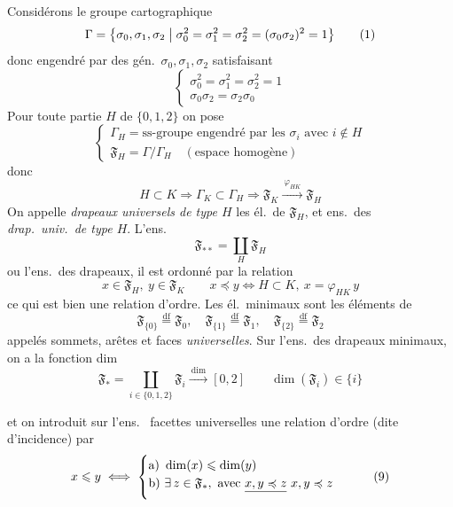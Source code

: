 \documentclass[11pt,a4paper]{article}
\begin{document}
Considérons le groupe cartographique
\[
\Gamma = \bigl\{\sigma_0, \sigma_1, \sigma_2 \bigm| \sigma_0^2 = \sigma_1^2 = \sigma_2^2 = (\sigma_0\sigma_2)^2 = 1\bigr\} \tag{1}
\]
donc engendré par des gén.\ $\sigma_0, \sigma_1, \sigma_2$ satisfaisant
\[
\begin{cases} \sigma_0^2 = \sigma_1^2 = \sigma_2^2 = 1 \\ \sigma_0\sigma_2 = \sigma_2\sigma_0 \end{cases} \tag{2}
\]
 Pour toute partie  \struck{\ill{}} $H$ de $\{0, 1, 2\}$  on pose
\[
\begin{cases}
\Gamma_H = \text{ss-groupe engendré par les } \sigma_i \text{ avec } i \notin H \\
\mathfrak{F}_H = \Gamma/\Gamma_H \quad (\text{espace homogène})
\end{cases} \tag{3}
\]
 donc
\[
H \subset K \Rightarrow \Gamma_K \subset \Gamma_H \Rightarrow \mathfrak{F}_K \xrightarrow{\ \varphi_{HK}\ } \mathfrak{F}_H \tag{4}
\]
On appelle \emph{drapeaux universels de type $H$} les él.\ de $\mathfrak{F}_H$, et \struck{\ill{}} ens.\ des \emph{drap.\ univ.\ de type $H$}. L'ens.
\[
\mathfrak{F}_{**} = \coprod_{H} \mathfrak{F}_H \tag{5}
\]
ou l'ens.\ des drapeaux, il est ordonné par la relation
\[
x \in \mathfrak{F}_H,\ y \in \mathfrak{F}_K \qquad x \preccurlyeq y \iff H \subset K,\ x = \varphi_{HK}\, y \tag{6}
\]
ce qui est bien une relation d'ordre. Les él.\ minimaux sont les éléments de
\[
\mathfrak{F}_{\{0\}} \overset{\text{df}}{=} \mathfrak{F}_0, \quad \mathfrak{F}_{\{1\}} \overset{\text{df}}{=} \mathfrak{F}_1, \quad \mathfrak{F}_{\{2\}} \overset{\text{df}}{=} \mathfrak{F}_2 \tag{7}
\]
appelés \struck{\ill{}} sommets, arêtes et faces \emph{universelles}. Sur l'ens.\ des drapeaux minimaux, on a la fonction dim
\[
\mathfrak{F}_* = \coprod_{i \in \{0,1,2\}} \mathfrak{F}_i \xrightarrow{\ \dim\ } [0, 2] \qquad \dim(\mathfrak{F}_i) \in \{i\} \tag{8}
\]

et on introduit sur l'ens.\   facettes universelles une relation d'ordre (dite d'incidence) par
\[
x \leqslant y \iff
\begin{cases}
\text{a) } \dim(x) \leqslant \dim(y) \\
\text{b) } \exists\, z \in \mathfrak{F}_*, \text{ avec } \struck{x, y \preccurlyeq z}\ x, y \preccurlyeq z
\end{cases} \tag{9}
\]
\end{document}
